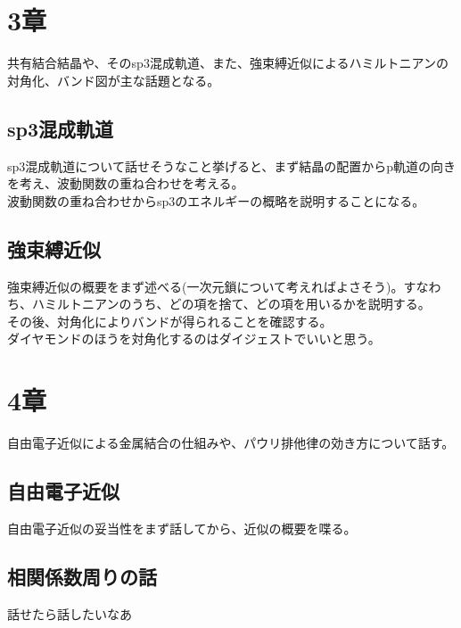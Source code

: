 \documentclass[a4paper,11pt]{jsarticle}
\begin{document}
\section*{3章}
共有結合結晶や、そのsp3混成軌道、また、強束縛近似によるハミルトニアンの対角化、バンド図が主な話題となる。\\
\subsection*{sp3混成軌道}
sp3混成軌道について話せそうなこと挙げると、まず結晶の配置からp軌道の向きを考え、波動関数の重ね合わせを考える。\\
波動関数の重ね合わせからsp3のエネルギーの概略を説明することになる。\\
\subsection*{強束縛近似}
強束縛近似の概要をまず述べる(一次元鎖について考えればよさそう)。すなわち、ハミルトニアンのうち、どの項を捨て、どの項を用いるかを説明する。\\
その後、対角化によりバンドが得られることを確認する。\\
ダイヤモンドのほうを対角化するのはダイジェストでいいと思う。\\
\section*{4章}
自由電子近似による金属結合の仕組みや、パウリ排他律の効き方について話す。
\subsection*{自由電子近似}
自由電子近似の妥当性をまず話してから、近似の概要を喋る。
\subsection*{相関係数周りの話}
話せたら話したいなあ
\end{document}
